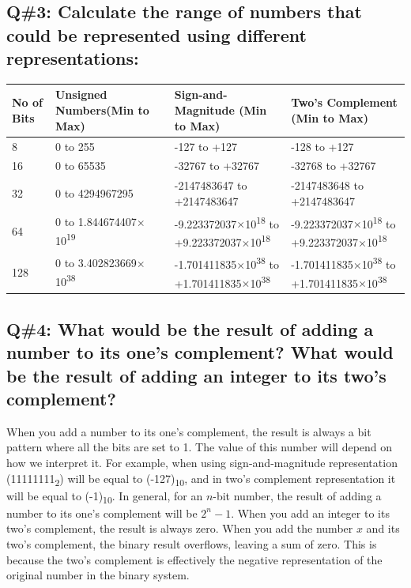 \subsection{Q\#3: Calculate the range of numbers that could be represented using different representations:}
\begin{table}[htbp]
\begin{tabularx}{\textwidth}{| X | X | X | X |}
\hline
\textbf{No of Bits} & \textbf{Unsigned Numbers(Min to Max)} & \textbf{Sign-and-Magnitude (Min to Max)} & \textbf{Two’s Complement (Min to Max)} \\
\hline
8 & 0 to 255 & -127 to +127 & -128 to +127 \\
\hline
16 & 0 to 65535 & -32767 to +32767 & -32768 to +32767 \\
\hline
32 & 0 to 4294967295 & -2147483647 to +2147483647 & -2147483648 to +2147483647 \\
\hline
64 & 0 to 1.844674407$\times$10\textsuperscript{19} & 
-9.223372037$\times$10\textsuperscript{18} to +9.223372037$\times$10\textsuperscript{18} & 
-9.223372037$\times$10\textsuperscript{18} to +9.223372037$\times$10\textsuperscript{18} \\
\hline
128 & 0 to 3.402823669$\times$10\textsuperscript{38} & 
-1.701411835$\times$10\textsuperscript{38} to +1.701411835$\times$10\textsuperscript{38} & 
-1.701411835$\times$10\textsuperscript{38} to +1.701411835$\times$10\textsuperscript{38} \\
\hline
\end{tabularx}
\end{table}

\subsection{Q\#4: What would be the result of adding a number to its one’s complement? What would be the result of adding an integer to its two’s complement?}
When you add a number to its one's complement, the result is always a bit pattern where all the bits are set to 1. The value of this number will depend on how we interpret it. For example, when using sign-and-magnitude representation (11111111\textsubscript{2}) will be equal to (-127)\textsubscript{10}, and in two’s complement representation it will be equal to (-1)\textsubscript{10}. In general, for an $n$-bit number, the result of adding a number to its one's complement will be $2^n - 1$.
When you add an integer to its two’s complement, the result is always zero. When you add the number $x$ and its two’s complement, the binary result overflows, leaving a sum of zero. This is because the two’s complement is effectively the negative representation of the original number in the binary system.
